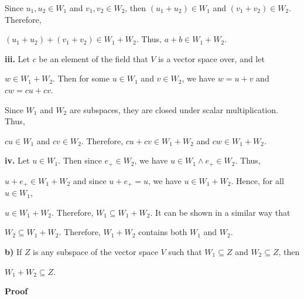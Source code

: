 \documentclass[12pt, a4paper]{article}
\begin{document}
\vspace{2mm}

\par Since $u_1,u_2\in W_1$ and $v_1,v_2\in W_2$, then $(u_1+u_2)\in W_1$ and $(v_1+v_2)\in W_2$. Therefore, \par $(u_1+u_2)+(v_1+v_2)\in W_1+W_2$. Thus, $a+b\in W_1+W_2$.

\newpage

\par\hspace{4mm}\textbf{iii.} Let $c$ be an element of the field that $V$ is a vector space over, and let\par $w\in W_1+W_2$. Then for some $u\in W_1$ and $v\in W_2$, we have $w=u+v$ and $cw=cu+cv$.\par Since $W_1$ and $W_2$ are subspaces, they are closed under scalar multiplication. Thus,\par $cu\in W_1$ and $cv\in W_2$. Therefore, $cu+cv\in W_1+W_2$ and $cw\in W_1+W_2$.\par

\vspace{2mm}

\hspace{4mm}\textbf{iv.} Let $u\in W_1$. Then since $e_{+}\in W_2$, we have $u\in W_1\wedge e_{+}\in W_2$. Thus,\par $u+e_{+}\in W_1+W_2$ and since $u+e_{+}=u$, we have $u\in W_1+W_2$. Hence, for all $u\in W_1$,\par $u\in W_1+W_2$. Therefore, $W_1\subseteq W_1+W_2$. It can be shown in a similar way that\par $W_2\subseteq W_1+W_2$. Therefore, $W_1+W_2$ contains both $W_1$ and $W_2$.\hspace{35mm}\blacksquare\par

\vspace{4mm}

\par\textbf{b)} If $Z$ is any subspace of the vector space $V$ such that $W_1\subseteq Z$ and $W_2\subseteq Z$, then\par $W_1+W_2\subseteq Z$.\par

\vspace{4mm}

\par\textbf{Proof}\par

\vspace{2mm}
\end{document}
